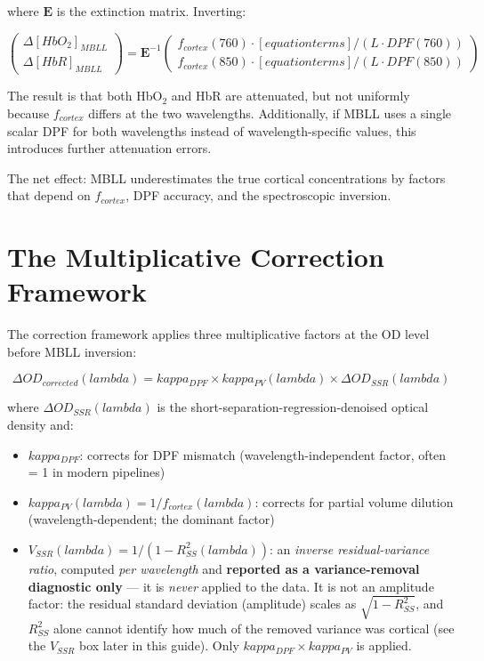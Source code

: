 \documentclass[12pt]{article}
\def\kappa{kappa}%
\def\lambda{lambda}%
\def\text#1{#1}%
\begin{document}
where $\mathbf{E}$ is the extinction matrix. Inverting:

\begin{equation}
\begin{pmatrix} \Delta[\text{HbO}_2]_{\text{MBLL}} \\ \Delta[\text{HbR}]_{\text{MBLL}} \end{pmatrix} = \mathbf{E}^{-1} \begin{pmatrix} f_{\text{cortex}}(760) \cdot [\text{equation terms}] / (L \cdot \text{DPF}(760)) \\ f_{\text{cortex}}(850) \cdot [\text{equation terms}] / (L \cdot \text{DPF}(850)) \end{pmatrix}
\end{equation}

The result is that both HbO$_2$ and HbR are attenuated, but not uniformly because $f_{\text{cortex}}$ differs at the two wavelengths. Additionally, if MBLL uses a single scalar DPF for both wavelengths instead of wavelength-specific values, this introduces further attenuation errors.

The net effect: MBLL underestimates the true cortical concentrations by factors that depend on $f_{\text{cortex}}$, DPF accuracy, and the spectroscopic inversion.

\section{The Multiplicative Correction Framework}

The correction framework applies three multiplicative factors at the OD level before MBLL inversion:

\begin{equation}
\Delta\text{OD}_{\text{corrected}}(\lambda) = \kappa_{\text{DPF}} \times \kappa_{\text{PV}}(\lambda) \times \Delta\text{OD}_{\text{SSR}}(\lambda)
\label{eq:correction_sequence}
\end{equation}

where $\Delta\text{OD}_{\text{SSR}}(\lambda)$ is the short-separation-regression-denoised optical density and:
\begin{itemize}
\item $\kappa_{\text{DPF}}$: corrects for DPF mismatch (wavelength-independent factor, often = 1 in modern pipelines)
\item $\kappa_{\text{PV}}(\lambda) = 1/f_{\text{cortex}}(\lambda)$: corrects for partial volume dilution (wavelength-dependent; the dominant factor)
\item $V_{\text{SSR}}(\lambda) = 1/(1 - R^2_{\text{SS}}(\lambda))$: an \emph{inverse residual-variance ratio}, computed \emph{per wavelength} and \textbf{reported as a variance-removal diagnostic only} --- it is \emph{never} applied to the data. It is not an amplitude factor: the residual standard deviation (amplitude) scales as $\sqrt{1 - R^2_{\text{SS}}}$, and $R^2_{\text{SS}}$ alone cannot identify how much of the removed variance was cortical (see the $V_{\text{SSR}}$ box later in this guide). Only $\kappa_{\text{DPF}}\times\kappa_{\text{PV}}$ is applied.
\end{itemize}
\end{document}
